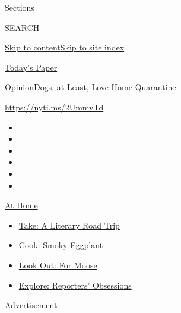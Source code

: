 Sections

SEARCH

\protect\hyperlink{site-content}{Skip to
content}\protect\hyperlink{site-index}{Skip to site index}

\href{https://myaccount.nytimes3xbfgragh.onion/auth/login?response_type=cookie\&client_id=vi}{}

\href{https://www.nytimes3xbfgragh.onion/section/todayspaper}{Today's
Paper}

\href{/section/opinion}{Opinion}\textbar{}Dogs, at Least, Love Home
Quarantine

\url{https://nyti.ms/2UmmvTd}

\begin{itemize}
\item
\item
\item
\item
\item
\item
\end{itemize}

\href{https://www.nytimes3xbfgragh.onion/spotlight/at-home?action=click\&pgtype=Article\&state=default\&region=TOP_BANNER\&context=at_home_menu}{At
Home}

\begin{itemize}
\tightlist
\item
  \href{https://www.nytimes3xbfgragh.onion/2020/07/28/books/time-for-a-literary-road-trip.html?action=click\&pgtype=Article\&state=default\&region=TOP_BANNER\&context=at_home_menu}{Take:
  A Literary Road Trip}
\item
  \href{https://www.nytimes3xbfgragh.onion/2020/07/29/magazine/bored-with-your-home-cooking-some-smoky-eggplant-will-fix-that.html?action=click\&pgtype=Article\&state=default\&region=TOP_BANNER\&context=at_home_menu}{Cook:
  Smoky Eggplant}
\item
  \href{https://www.nytimes3xbfgragh.onion/2020/07/27/travel/moose-michigan-isle-royale.html?action=click\&pgtype=Article\&state=default\&region=TOP_BANNER\&context=at_home_menu}{Look
  Out: For Moose}
\item
  \href{https://www.nytimes3xbfgragh.onion/interactive/2020/at-home/even-more-reporters-editors-diaries-lists-recommendations.html?action=click\&pgtype=Article\&state=default\&region=TOP_BANNER\&context=at_home_menu}{Explore:
  Reporters' Obsessions}
\end{itemize}

Advertisement

